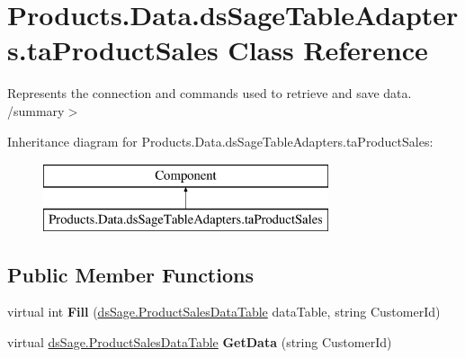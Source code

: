 \hypertarget{class_products_1_1_data_1_1ds_sage_table_adapters_1_1ta_product_sales}{}\section{Products.\+Data.\+ds\+Sage\+Table\+Adapters.\+ta\+Product\+Sales Class Reference}
\label{class_products_1_1_data_1_1ds_sage_table_adapters_1_1ta_product_sales}


Represents the connection and commands used to retrieve and save data. /summary$>$  


Inheritance diagram for Products.\+Data.\+ds\+Sage\+Table\+Adapters.\+ta\+Product\+Sales\+:\begin{figure}[H]
\begin{center}
\leavevmode
\includegraphics[height=2.000000cm]{class_products_1_1_data_1_1ds_sage_table_adapters_1_1ta_product_sales}
\end{center}
\end{figure}
\subsection*{Public Member Functions}
\begin{DoxyCompactItemize}
\item 
virtual int {\bfseries Fill} (\hyperlink{class_products_1_1_data_1_1ds_sage_1_1_product_sales_data_table}{ds\+Sage.\+Product\+Sales\+Data\+Table} data\+Table, string Customer\+Id)\hypertarget{class_products_1_1_data_1_1ds_sage_table_adapters_1_1ta_product_sales_acfb9dd5aaca47d621ccc0a4d680f1e6b}{}\label{class_products_1_1_data_1_1ds_sage_table_adapters_1_1ta_product_sales_acfb9dd5aaca47d621ccc0a4d680f1e6b}

\item 
virtual \hyperlink{class_products_1_1_data_1_1ds_sage_1_1_product_sales_data_table}{ds\+Sage.\+Product\+Sales\+Data\+Table} {\bfseries Get\+Data} (string Customer\+Id)\hypertarget{class_products_1_1_data_1_1ds_sage_table_adapters_1_1ta_product_sales_a3fa30bf0d2b25cb54e38f3dd053025c9}{}\label{class_products_1_1_data_1_1ds_sage_table_adapters_1_1ta_product_sales_a3fa30bf0d2b25cb54e38f3dd053025c9}

\end{DoxyCompactItemize}
